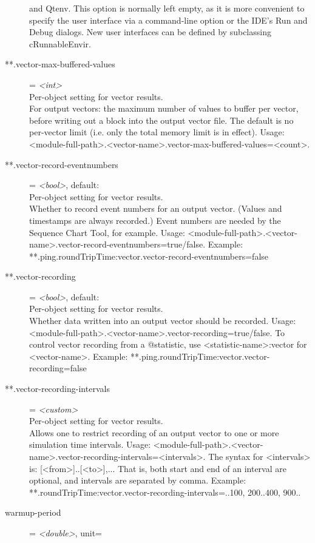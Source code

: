 \begin{description}
    and Qtenv. This option is normally left empty, as it is more convenient to
    specify the user interface via a command-line option or the IDE's Run and
    Debug dialogs. New user interfaces can be defined by subclassing
    cRunnableEnvir.
\item[**.vector-max-buffered-values] = \textit{<int>}\\
    Per-object setting for vector results.\\
    For output vectors: the maximum number of values to buffer per vector,
    before writing out a block into the output vector file. The default is no
    per-vector limit (i.e. only the total memory limit is in effect). Usage:
    <module-full-path>.<vector-name>.vector-max-buffered-values=<count>.
\item[**.vector-record-eventnumbers] = \textit{<bool>}, default: \\
    Per-object setting for vector results.\\
    Whether to record event numbers for an output vector. (Values and
    timestamps are always recorded.) Event numbers are needed by the Sequence
    Chart Tool, for example. Usage:
    <module-full-path>.<vector-name>.vector-record-eventnumbers=true/false.
    Example: **.ping.roundTripTime:vector.vector-record-eventnumbers=false
\item[**.vector-recording] = \textit{<bool>}, default: \\
    Per-object setting for vector results.\\
    Whether data written into an output vector should be recorded. Usage:
    <module-full-path>.<vector-name>.vector-recording=true/false. To control
    vector recording from a @statistic, use <statistic-name>:vector for
    <vector-name>. Example: **.ping.roundTripTime:vector.vector-recording=false
\item[**.vector-recording-intervals] = \textit{<custom>}\\
    Per-object setting for vector results.\\
    Allows one to restrict recording of an output vector to one or more
    simulation time intervals. Usage:
    <module-full-path>.<vector-name>.vector-recording-intervals=<intervals>.
    The syntax for <intervals> is: [<from>]..[<to>],... That is, both start and
    end of an interval are optional, and intervals are separated by comma.
    Example: **.roundTripTime:vector.vector-recording-intervals=..100,
    200..400, 900..
\item[warmup-period] = \textit{<double>}, unit=\\

\end{description}
